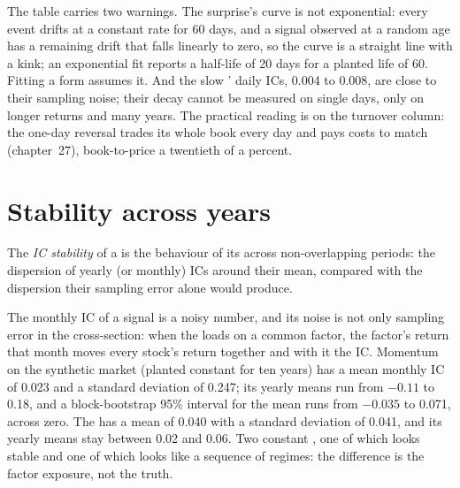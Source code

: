 The table carries two warnings. The surprise's curve is not exponential: every event drifts at a constant rate for 60 days, and a signal
observed at a random age has a remaining drift that falls linearly to zero, so the curve is a straight line with a kink; an exponential
fit reports a half-life of 20 days for a planted life of 60. Fitting a form assumes it. And the slow ' daily ICs, 0.004 to 0.008,
are close to their sampling noise; their decay cannot be measured on single days, only on longer returns and many years. The practical
reading is on the turnover column: the one-day reversal trades its whole book every day and pays costs to match (chapter~27), book-to-price
a twentieth of a percent.

\section{Stability across years}

\begin{definition}[IC stability]\label{def:rs:half-life-decay-and-stability:stability}
The \emph{IC stability} of a  is the behaviour of its  across non-overlapping
periods: the dispersion of yearly (or monthly) ICs around their mean, compared with the dispersion their sampling error alone would produce.
\end{definition}

The monthly IC of a signal is a noisy number, and its noise is not only sampling error in the cross-section: when the  loads on a
common factor, the factor's return that month moves every stock's return together and with it the IC. Momentum on the synthetic market
(planted constant for ten years) has a mean monthly IC of 0.023 and a standard deviation of 0.247; its yearly means run from $-0.11$ to
0.18, and a block-bootstrap 95\% interval for the mean runs from $-0.035$ to 0.071, across zero. The  has a mean of 0.040
with a standard deviation of 0.041, and its yearly means stay between 0.02 and 0.06. Two constant , one of which looks stable and
one of which looks like a sequence of regimes: the difference is the factor exposure, not the truth.


